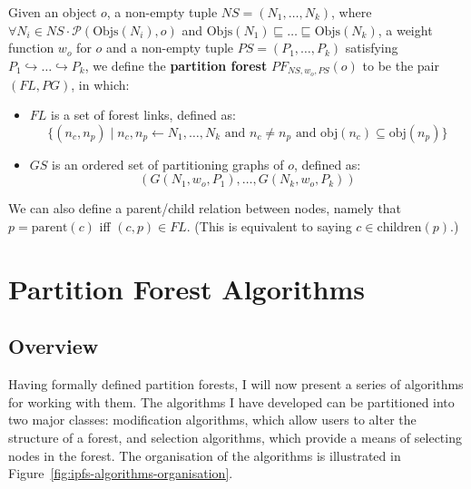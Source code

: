 \begin{definition}
Given an object $o$, a non-empty tuple $\textit{NS} = (N_1,\ldots,N_k)$, where $\forall N_i \in \textit{NS} \cdot \mathcal{P}(\mbox{Objs}(N_i),o)$ and $\mbox{Objs}(N_1) \sqsubseteq \ldots \sqsubseteq \mbox{Objs}(N_k)$, a weight function $w_o$ for $o$ and a non-empty tuple $\textit{PS} = (P_1,\ldots,P_k)$ satisfying $P_1 \hookrightarrow \ldots \hookrightarrow P_k$, we define the \textbf{partition forest} $PF_{\textit{NS},w_o,\textit{PS}}(o)$ to be the pair $(\textit{FL},\textit{PG})$, in which:

\begin{itemize}

\item $\textit{FL}$ is a set of forest links, defined as:
%
\[
\{(n_c,n_p) \; | \; n_c, n_p \leftarrow N_1,\ldots,N_k \mbox{ and } n_c \ne n_p \mbox{ and } \mbox{obj}(n_c) \subseteq \mbox{obj}(n_p)\}
\]

\item $\textit{GS}$ is an ordered set of partitioning graphs of $o$, defined as:
%
\[
(G(N_1,w_o,P_1),\ldots,G(N_k,w_o,P_k))
\]

\end{itemize}

\end{definition}

\noindent We can also define a parent/child relation between nodes, namely that $p = \mbox{parent}(c)$ iff $(c,p) \in \textit{FL}$. (This is equivalent to saying $c \in \mbox{children}(p)$.)

\section{Partition Forest Algorithms}
\label{sec:ipfs-algorithms}

\subsection{Overview}

Having formally defined partition forests, I will now present a series of algorithms for working with them. The algorithms I have developed can be partitioned into two major classes: modification algorithms, which allow users to alter the structure of a forest, and selection algorithms, which provide a means of selecting nodes in the forest. The organisation of the algorithms is illustrated in Figure~\ref{fig:ipfs-algorithms-organisation}.


